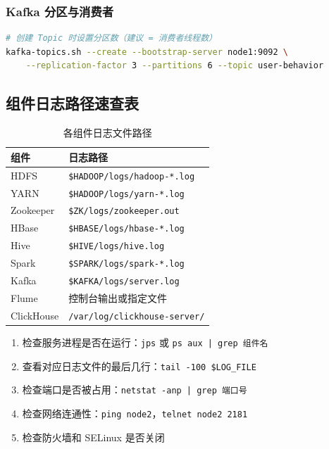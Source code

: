 \documentclass[12pt,a4paper]{article}
\begin{document}
\subsubsection{Kafka 分区与消费者}

\begin{lstlisting}[language=bash]
# 创建 Topic 时设置分区数（建议 = 消费者线程数）
kafka-topics.sh --create --bootstrap-server node1:9092 \
    --replication-factor 3 --partitions 6 --topic user-behavior
\end{lstlisting}

\subsection{组件日志路径速查表}

\begin{table}[H]
\centering
\caption{各组件日志文件路径}
{\footnotesize
\begin{tabular}{ll}
\toprule
\textbf{组件} & \textbf{日志路径} \\
\midrule
HDFS & \texttt{\$HADOOP/logs/hadoop-*.log} \\
YARN & \texttt{\$HADOOP/logs/yarn-*.log} \\
Zookeeper & \texttt{\$ZK/logs/zookeeper.out} \\
HBase & \texttt{\$HBASE/logs/hbase-*.log} \\
Hive & \texttt{\$HIVE/logs/hive.log} \\
Spark & \texttt{\$SPARK/logs/spark-*.log} \\
Kafka & \texttt{\$KAFKA/logs/server.log} \\
Flume & 控制台输出或指定文件 \\
ClickHouse & \texttt{/var/log/clickhouse-server/} \\
\bottomrule
\end{tabular}
}
\end{table}

\begin{tipbox}[排查问题的方法]
\begin{enumerate}
    \item 检查服务进程是否在运行：\texttt{jps} 或 \texttt{ps aux | grep 组件名}
    \item 查看对应日志文件的最后几行：\texttt{tail -100 \$LOG\_FILE}
    \item 检查端口是否被占用：\texttt{netstat -anp | grep 端口号}
    \item 检查网络连通性：\texttt{ping node2}，\texttt{telnet node2 2181}
    \item 检查防火墙和 SELinux 是否关闭
\end{enumerate}
\end{tipbox}
\end{document}

